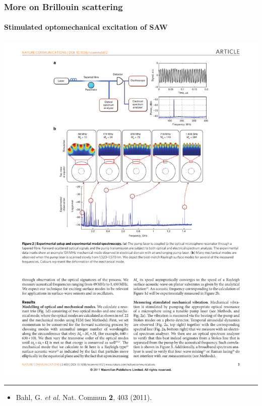 \documentclass{beamer}
\def\etal{\emph{et al. }}
\begin{document}

\begin{frame}
\frametitle{More on Brillouin scattering}
\framesubtitle{Stimulated optomechanical excitation of SAW}
\begin{center}
\includegraphics[width=0.8\columnwidth]{f5.pdf}
\end{center}


\noindent\rule{0.1\textwidth}{0.5pt}

\begin{itemize}
\item \tiny{Bahl, G. \etal Nat. Commun \textbf{2}, 403 (2011).
}
\end{itemize}
\end{frame}

\end{document}
